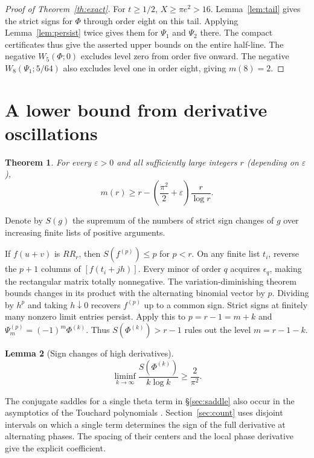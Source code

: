 \documentclass[11pt,a4paper,reqno]{amsart}
\newtheorem{theorem}{Theorem}[section]
\newtheorem{lemma}[theorem]{Lemma}
\numberwithin{equation}{section}
\begin{document}
\begin{proof}[Proof of Theorem~\ref{th:exact}]
For \(t\ge1/2\), \(X\ge\pi e^2>16\). Lemma~\ref{lem:tail} gives the strict signs for \(\Phi\) through order eight on this tail. Applying Lemma~\ref{lem:persist} twice gives them for \(\Psi_1\) and \(\Psi_2\) there. The compact certificates thus give the asserted upper bounds on the entire half-line. The negative \(W_5(\Phi;0)\) excludes level zero from order five onward. The negative \(W_8(\Psi_1;5/64)\) also excludes level one in order eight, giving \(m(8)=2\).
\end{proof}


\section{A lower bound from derivative oscillations}\label{sec:lower}


\begin{theorem}\label{th:lower}
For every \(\varepsilon>0\) and all sufficiently large integers \(r\) (depending on \(\varepsilon\)),
\[m(r)\ge r-\left(\frac{\pi^2}{2}+\varepsilon\right)\frac{r}{\log r}.\]
\end{theorem}


Denote by \(S(g)\) the supremum of the numbers of strict sign changes of \(g\) over increasing finite lists of positive arguments.

If \(f(u+v)\) is \(RR_r\), then \(S(f^{(p)})\le p\) for \(p<r\). On any finite list \(t_i\), reverse the \(p+1\) columns of \([f(t_i+jh)]\). Every minor of order \(q\) acquires \(\epsilon_q\), making the rectangular matrix totally nonnegative. The variation-diminishing theorem \cite{ckk} bounds changes in its product with the alternating binomial vector by \(p\). Dividing by \(h^p\) and taking \(h\downarrow0\) recovers \(f^{(p)}\) up to a common sign. Strict signs at finitely many nonzero limit entries persist. Apply this to \(p=r-1=m+k\) and \(\Psi_m^{(p)}=(-1)^m\Phi^{(k)}\). Thus \(S(\Phi^{(k)})>r-1\) rules out the level \(m=r-1-k\).

\begin{lemma}[Sign changes of high derivatives]\label{lem:osc}
\[\liminf_{k\to\infty}\frac{S(\Phi^{(k)})}{k\log k}\ge \frac{2}{\pi^2}.\]
\end{lemma}
The conjugate saddles for a single theta term in \S\ref{sec:saddle} also occur in the asymptotics of the Touchard polynomials \cite{paris}. Section~\ref{sec:count} uses disjoint intervals on which a single term determines the sign of the full derivative at alternating phases. The spacing of their centers and the local phase derivative give the explicit coefficient.
\end{document}
